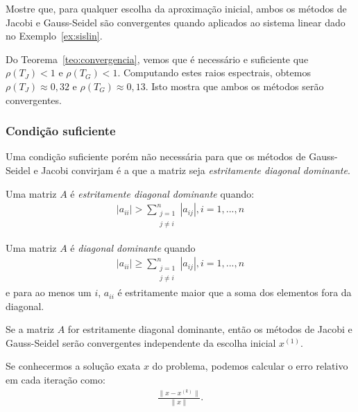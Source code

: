\begin{ex}
  Mostre que, para qualquer escolha da aproximação inicial, ambos os métodos de Jacobi e Gauss-Seidel são convergentes quando aplicados ao sistema linear dado no Exemplo~\ref{ex:sislin}.
\end{ex}
\begin{sol}
  Do Teorema~\ref{teo:convergencia}, vemos que é necessário e suficiente que $\rho(T_J) < 1$ e $\rho(T_G) < 1$. Computando estes raios espectrais, obtemos $\rho(T_J) \approx 0,32$ e $\rho(T_G) \approx 0,13$. Isto mostra que ambos os métodos serão convergentes. 
\end{sol}

\subsubsection{Condição suficiente}

Uma condição suficiente porém não necessária para que os métodos de Gauss-Seidel e Jacobi convirjam é a que a matriz seja \emph{estritamente diagonal dominante}.

\begin{defn}
 Uma matriz $A$ é \emph{estritamente diagonal dominante} quando:
\begin{align}
  |a_{ii}|> \sum_{\substack{j=1\\j\ne i}}^{n} |a_{ij}|, i=1,...,n
\end{align}
\end{defn}

\begin{defn}
 Uma matriz $A$ é \emph{diagonal dominante} quando
\begin{align}
  |a_{ii}| \geq \sum_{\substack{j=1\\j\ne i}}^{n} |a_{ij}|, i=1,...,n
\end{align}
e para ao menos um $i$, $a_{ii}$ é estritamente maior que a soma dos elementos fora da diagonal.
\end{defn}

\begin{teo}
 Se a matriz $A$ for estritamente diagonal dominante, então os métodos de Jacobi e Gauss-Seidel serão convergentes independente da escolha inicial $x^{(1)}$.
\end{teo}

Se conhecermos a solução exata $x$ do problema, podemos calcular o erro relativo em cada iteração como:
\begin{align}
   \frac{ \|x-x^{(k)}\|}{\|x\|}.
\end{align}

